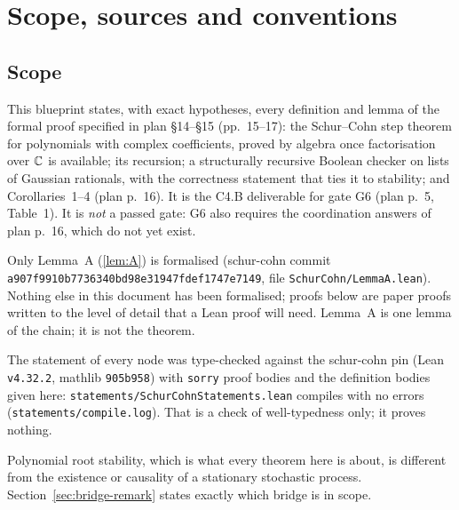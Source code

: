 %

\chapter{Scope, sources and conventions}

\section{Scope}

This blueprint states, with exact hypotheses, every definition and lemma of the
formal proof specified in plan \S14--\S15 (pp.~15--17): the Schur--Cohn step
theorem for polynomials with complex coefficients, proved by algebra once
factorisation over $\mathbb{C}$ is available; its recursion; a structurally recursive
Boolean checker on lists of Gaussian rationals, with the correctness statement
that ties it to stability; and Corollaries~1--4 (plan p.~16). It is the C4.B
deliverable for gate G6 (plan p.~5, Table~1). It is \emph{not} a passed gate:
G6 also requires the coordination answers of plan p.~16, which do not yet exist.

Only Lemma~A (\ref{lem:A}) is formalised (schur-cohn commit
\texttt{a907f9910b7736340bd98e31947fdef1747e7149}, file
\texttt{SchurCohn/LemmaA.lean}). Nothing else in this document has been
formalised; proofs below are paper proofs written to the level of detail that a
Lean proof will need. Lemma~A is one lemma of the chain; it is not the theorem.

The statement of every node was type-checked against the schur-cohn pin
(Lean \texttt{v4.32.2}, mathlib \texttt{905b958}) with \texttt{sorry} proof
bodies and the definition bodies given here: \texttt{statements/SchurCohnStatements.lean}
compiles with no errors (\texttt{statements/compile.log}). That is a check of
well-typedness only; it proves nothing.

Polynomial root stability, which is what every theorem here is about, is
different from the existence or causality of a stationary stochastic process.
Section~\ref{sec:bridge-remark} states exactly which bridge is in scope.

